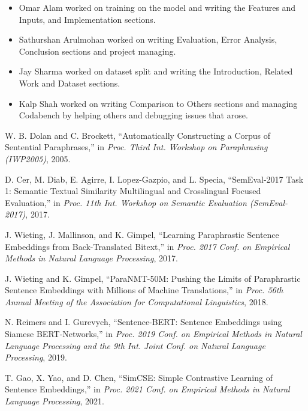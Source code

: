 \documentclass[11pt]{article}
\begin{document}
\begin{itemize}
  \item Omar Alam worked on training on the model and writing the Features and Inputs, and Implementation sections.
  \item Sathurshan Arulmohan worked on writing Evaluation, Error Analysis, Conclusion sections and project managing.
  \item Jay Sharma worked on dataset split and writing the Introduction, Related Work and Dataset sections.
  \item  Kalp Shah worked on writing Comparison to Others sections and managing Codabench by helping others
and debugging issues that arose.
\end{itemize}




\begin{thebibliography}{}

W. B. Dolan and C. Brockett, ``Automatically Constructing a Corpus of Sentential Paraphrases,'' in \textit{Proc. Third Int. Workshop on Paraphrasing (IWP2005)}, 2005.

D. Cer, M. Diab, E. Agirre, I. Lopez-Gazpio, and L. Specia, ``SemEval-2017 Task 1: Semantic Textual Similarity Multilingual and Crosslingual Focused Evaluation,'' in \textit{Proc. 11th Int. Workshop on Semantic Evaluation (SemEval-2017)}, 2017.

J. Wieting, J. Mallinson, and K. Gimpel, ``Learning Paraphrastic Sentence Embeddings from Back-Translated Bitext,'' in \textit{Proc. 2017 Conf. on Empirical Methods in Natural Language Processing}, 2017.

J. Wieting and K. Gimpel, ``ParaNMT-50M: Pushing the Limits of Paraphrastic Sentence Embeddings with Millions of Machine Translations,'' in \textit{Proc. 56th Annual Meeting of the Association for Computational Linguistics}, 2018.

N. Reimers and I. Gurevych, ``Sentence-BERT: Sentence Embeddings using Siamese BERT-Networks,'' in \textit{Proc. 2019 Conf. on Empirical Methods in Natural Language Processing and the 9th Int. Joint Conf. on Natural Language Processing}, 2019.

T. Gao, X. Yao, and D. Chen, ``SimCSE: Simple Contrastive Learning of Sentence Embeddings,'' in \textit{Proc. 2021 Conf. on Empirical Methods in Natural Language Processing}, 2021.

\end{thebibliography}



\end{document}
